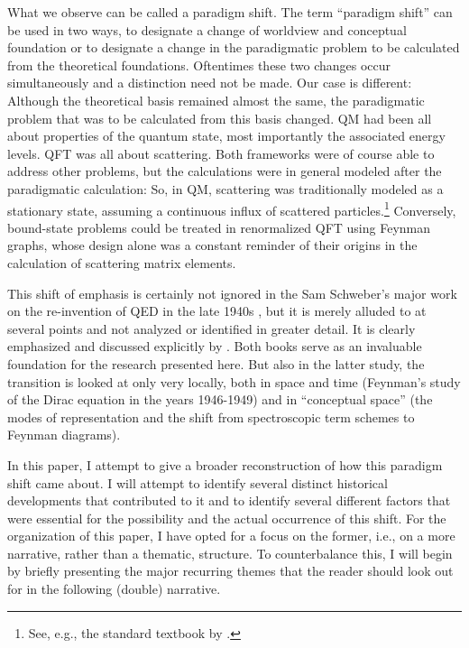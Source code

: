 \documentclass[12pt,a4paper]{article}
\begin{document}
What we observe can be called a paradigm shift. The term ``paradigm shift'' can be used in two ways, to designate a change of worldview and conceptual foundation or to designate a change in the paradigmatic problem to be calculated from the theoretical foundations. Oftentimes these two changes occur simultaneously and a distinction need not be made. Our case is different: Although the theoretical basis remained almost the same, the paradigmatic problem that was to be calculated from this basis changed. QM had been all about properties of the quantum state, most importantly the associated energy levels. QFT was all about scattering. Both frameworks were of course able to address other problems, but the calculations were in general modeled after the paradigmatic calculation: So, in QM, scattering was traditionally modeled as a stationary state, assuming a continuous influx of scattered particles.\footnote{See, e.g., the standard textbook by \citep[Section IX]{dirac_1935_the-principles}.} Conversely, bound-state problems could be treated in renormalized QFT using Feynman graphs, whose design alone was a constant reminder of their origins in the calculation of scattering matrix elements.

This shift of emphasis is certainly not ignored in the Sam Schweber's major work on the re-invention of QED in the late 1940s \citep{schweber_1994_qed}, but it is merely alluded to at several points and not analyzed or identified in greater detail. It is clearly emphasized and discussed explicitly by  \cite{wuethrich_2010_the-genesis}. Both books serve as an invaluable foundation for the research presented here. But also in the latter study, the transition is looked at only very locally, both in space and time (Feynman's study of the Dirac equation in the years 1946-1949) and in ``conceptual space'' (the modes of representation and the shift from spectroscopic term schemes to Feynman diagrams).

In this paper, I attempt to give a broader reconstruction of how this paradigm shift came about. I will attempt to identify several distinct historical developments that contributed to it and to identify several different factors that were essential for the possibility and the actual occurrence of this shift. For the organization of this paper, I have opted for a focus on the former, i.e., on a more narrative, rather than a thematic, structure. To counterbalance this, I will begin by briefly presenting the major recurring themes that the reader should look out for in the following (double) narrative.
\end{document}
